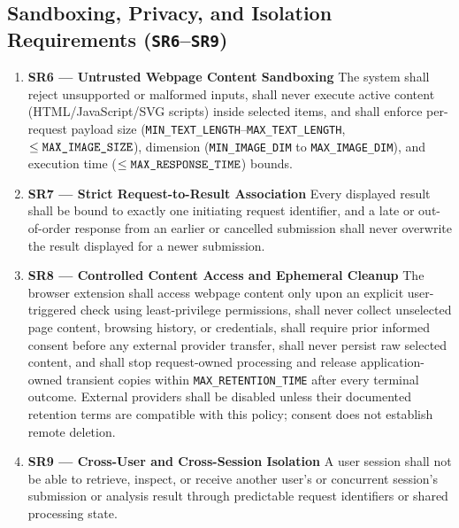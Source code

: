 \documentclass[11pt]{article}
\newcommand{\MaxResponseTime}{\texttt{MAX\_\allowbreak{}RESPONSE\_\allowbreak{}TIME}}
\newcommand{\MaxRetentionTime}{\texttt{MAX\_\allowbreak{}RETENTION\_\allowbreak{}TIME}}
\newcommand{\MinTextLength}{\texttt{MIN\_\allowbreak{}TEXT\_\allowbreak{}LENGTH}}
\newcommand{\MinImageDim}{\texttt{MIN\_\allowbreak{}IMAGE\_\allowbreak{}DIM}}
\newcommand{\MaxTextLength}{\texttt{MAX\_\allowbreak{}TEXT\_\allowbreak{}LENGTH}}
\newcommand{\MaxImageSize}{\texttt{MAX\_\allowbreak{}IMAGE\_\allowbreak{}SIZE}}
\newcommand{\MaxImageDim}{\texttt{MAX\_\allowbreak{}IMAGE\_\allowbreak{}DIM}}
\begin{document}
\subsection{Sandboxing, Privacy, and Isolation Requirements (\texttt{SR6}--\texttt{SR9})}

\begin{enumerate}[leftmargin=*, start=6]
    \item {}\label{SR6}\textbf{SR6 --- Untrusted Webpage Content Sandboxing}\newline
    The system shall reject unsupported or malformed inputs, shall never execute active content (HTML/JavaScript/SVG scripts) inside selected items, and shall enforce per-request payload size (\MinTextLength{}--\MaxTextLength{}, $\le \MaxImageSize{}$), dimension (\MinImageDim{} to \MaxImageDim{}), and execution time ($\le \MaxResponseTime{}$) bounds.

    \item {}\label{SR7}\textbf{SR7 --- Strict Request-to-Result Association}\newline
    Every displayed result shall be bound to exactly one initiating request identifier, and a late or out-of-order response from an earlier or cancelled submission shall never overwrite the result displayed for a newer submission.

    \item {}\label{SR8}\textbf{SR8 --- Controlled Content Access and Ephemeral Cleanup}\newline
    The browser extension shall access webpage content only upon an explicit user-triggered check using least-privilege permissions, shall never collect unselected page content, browsing history, or credentials, shall require prior informed consent before any external provider transfer, shall never persist raw selected content, and shall stop request-owned processing and release application-owned transient copies within \MaxRetentionTime{} after every terminal outcome. External providers shall be disabled unless their documented retention terms are compatible with this policy; consent does not establish remote deletion.

    \item {}\label{SR9}\textbf{SR9 --- Cross-User and Cross-Session Isolation}\newline
    A user session shall not be able to retrieve, inspect, or receive another user's or concurrent session's submission or analysis result through predictable request identifiers or shared processing state.

\end{enumerate}
\end{document}
